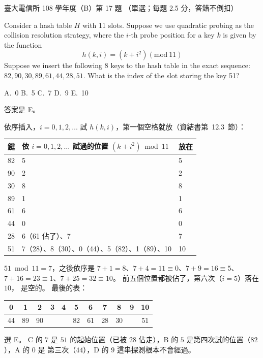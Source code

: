 \begin{pastexam}[label={px:ntu-108-comm-dsab-17}]{臺大電信所 108 學年度（B）第 17 題}
（單選；每題 2.5 分，答錯不倒扣）

Consider a hash table $H$ with 11 slots. Suppose we use quadratic probing as the collision
resolution strategy, where the $i$-th probe position for a key $k$ is given by the function
\[h(k,i)=(k+i^2)(\mathrm{mod}\ 11)\]
Suppose we insert the following 8 keys to the hash table in the exact sequence:
$82,90,30,89,61,44,28,51$. What is the index of the slot storing the key 51?

A.~0 \qquad B.~5 \qquad C.~7 \qquad D.~9 \qquad E.~10
\end{pastexam}

\begin{pastsoln}
答案是 E。

依序插入，$i = 0, 1, 2, \ldots$ 試 $h(k, i)$，第一個空格就放（資結書第~12.3~節）：
\begin{center}
\begin{tabular}{rll}
\toprule
鍵 & 依 $i = 0, 1, 2, \ldots$ 試過的位置 $(k + i^2) \bmod 11$ & 放在 \\
\midrule
82 & 5 & 5 \\
90 & 2 & 2 \\
30 & 8 & 8 \\
89 & 1 & 1 \\
61 & 6 & 6 \\
44 & 0 & 0 \\
28 & 6（61 佔了）、7 & 7 \\
51 & 7（28）、8（30）、0（44）、5（82）、1（89）、10 & 10 \\
\bottomrule
\end{tabular}
\end{center}
$51 \bmod 11 = 7$，之後依序是 $7 + 1 = 8$、$7 + 4 = 11 \equiv 0$、$7 + 9 = 16 \equiv 5$、
$7 + 16 = 23 \equiv 1$、$7 + 25 = 32 \equiv 10$。 前五個位置都被佔了，第六次（$i = 5$）落在 $10$，
是空的。 最後的表：
\begin{center}
\begin{tabular}{*{11}{c}}
\toprule
0 & 1 & 2 & 3 & 4 & 5 & 6 & 7 & 8 & 9 & 10 \\
\midrule
44 & 89 & 90 & & & 82 & 61 & 28 & 30 & & 51 \\
\bottomrule
\end{tabular}
\end{center}
選 E。 C 的 $7$ 是 $51$ 的起始位置（已被 $28$ 佔走），B 的 $5$ 是第四次試的位置（$82$），A 的 $0$ 是
第三次（$44$），D 的 $9$ 這串探測根本不會經過。
\end{pastsoln}
